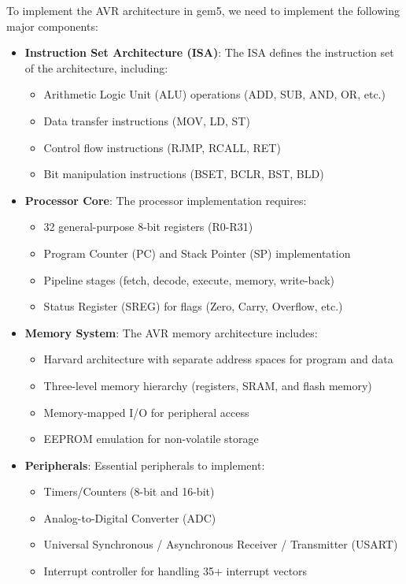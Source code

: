 To implement the AVR architecture in gem5, we need to implement the following major components:
\begin{itemize}
	\item \textbf{Instruction Set Architecture (ISA)}: The ISA defines the instruction set of the architecture, including:
	      \begin{itemize}
		      \item Arithmetic Logic Unit (ALU) operations (ADD, SUB, AND, OR, etc.)
		      \item Data transfer instructions (MOV, LD, ST)
		      \item Control flow instructions (RJMP, RCALL, RET)
		      \item Bit manipulation instructions (BSET, BCLR, BST, BLD)
	      \end{itemize}

	\item \textbf{Processor Core}: The processor implementation requires:
	      \begin{itemize}
		      \item 32 general-purpose 8-bit registers (R0-R31)
		      \item Program Counter (PC) and Stack Pointer (SP) implementation
		      \item Pipeline stages (fetch, decode, execute, memory, write-back)
		      \item Status Register (SREG) for flags (Zero, Carry, Overflow, etc.)
	      \end{itemize}

	\item \textbf{Memory System}: The AVR memory architecture includes:
	      \begin{itemize}
		      \item Harvard architecture with separate address spaces for program and data
		      \item Three-level memory hierarchy (registers, SRAM, and flash memory)
		      \item Memory-mapped I/O for peripheral access
		      \item EEPROM emulation for non-volatile storage
	      \end{itemize}

	\item \textbf{Peripherals}: Essential peripherals to implement:
	      \begin{itemize}
		      \item Timers/Counters (8-bit and 16-bit)
		      \item Analog-to-Digital Converter (ADC)
		      \item Universal Synchronous / Asynchronous Receiver / Transmitter (USART)
		      \item Interrupt controller for handling 35+ interrupt vectors
	      \end{itemize}
\end{itemize}

